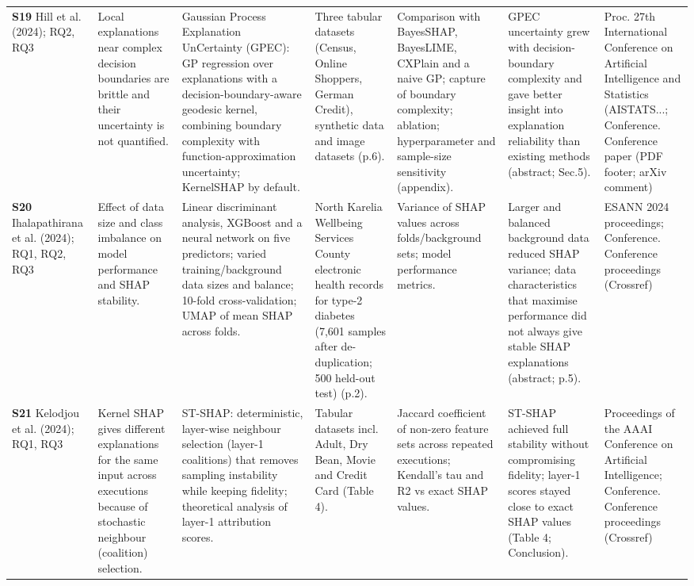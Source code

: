 \begin{longtable}{@{}P{1.55cm}P{2.9cm}P{4.5cm}P{3.2cm}P{3.4cm}P{4.6cm}P{3.6cm}@{}}
\textbf{S19} \cite{S19} Hill et al. (2024); RQ2, RQ3 & Local explanations near complex decision boundaries are brittle and their uncertainty is not quantified. & Gaussian Process Explanation UnCertainty (GPEC): GP regression over explanations with a decision-boundary-aware geodesic kernel, combining boundary complexity with function-approximation uncertainty; KernelSHAP by default. & Three tabular datasets (Census, Online Shoppers, German Credit), synthetic data and image datasets (p.6). & Comparison with BayesSHAP, BayesLIME, CXPlain and a naive GP; capture of boundary complexity; ablation; hyperparameter and sample-size sensitivity (appendix). & GPEC uncertainty grew with decision-boundary complexity and gave better insight into explanation reliability than existing methods (abstract; Sec.5). & Proc. 27th International Conference on Artificial Intelligence and Statistics (AISTATS...; Conference. Conference paper (PDF footer; arXiv comment) \\
\textbf{S20} \cite{S20} Ihalapathirana et al. (2024); RQ1, RQ2, RQ3 & Effect of data size and class imbalance on model performance and SHAP stability. & Linear discriminant analysis, XGBoost and a neural network on five predictors; varied training/\allowbreak{}background data sizes and balance; 10-fold cross-validation; UMAP of mean \textbar{}SHAP\textbar{} across folds. & North Karelia Wellbeing Services County electronic health records for type-2 diabetes (7,601 samples after de-duplication; 500 held-out test) (p.2). & Variance of SHAP values across folds/\allowbreak{}background sets; model performance metrics. & Larger and balanced background data reduced SHAP variance; data characteristics that maximise performance did not always give stable SHAP explanations (abstract; p.5). & ESANN 2024 proceedings; Conference. Conference proceedings (Crossref) \\
\textbf{S21} \cite{S21} Kelodjou et al. (2024); RQ1, RQ3 & Kernel SHAP gives different explanations for the same input across executions because of stochastic neighbour (coalition) selection. & ST-SHAP: deterministic, layer-wise neighbour selection (layer-1 coalitions) that removes sampling instability while keeping fidelity; theoretical analysis of layer-1 attribution scores. & Tabular datasets incl. Adult, Dry Bean, Movie and Credit Card (Table 4). & Jaccard coefficient of non-zero feature sets across repeated executions; Kendall's tau and R2 vs exact SHAP values. & ST-SHAP achieved full stability without compromising fidelity; layer-1 scores stayed close to exact SHAP values (Table 4; Conclusion). & Proceedings of the AAAI Conference on Artificial Intelligence; Conference. Conference proceedings (Crossref) \\

\end{longtable}
